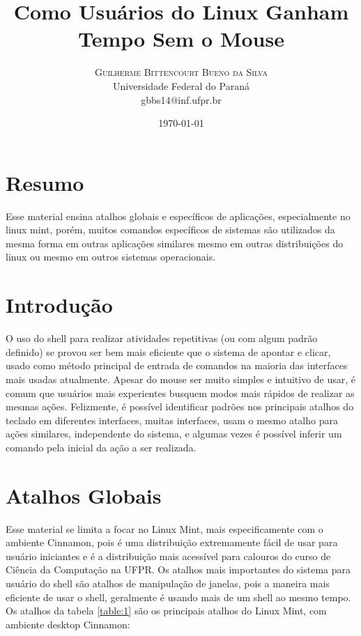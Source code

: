 \documentclass[oneside, 11 pt]{article}
\title{Como Usuários do Linux Ganham Tempo Sem o Mouse} %
\author{%
	\textsc{Guilherme Bittencourt Bueno da Silva} \\[1ex] %
	\normalsize Universidade Federal do Paraná \\ %
	\normalsize {gbbs14@inf.ufpr.br} %
}
\date{\today} %
\begin{document}
	
	\maketitle
	
	\section{Resumo}
	Esse material ensina atalhos globais e específicos de aplicações, especialmente no linux mint, porém, muitos comandos específicos de sistemas são utilizados da mesma forma em outras aplicações similares mesmo em outras distribuições do linux ou mesmo em outros sistemas operacionais.
	
	\section{Introdução}
	O uso do shell para realizar atividades repetitivas (ou com algum padrão definido) se provou ser bem mais eficiente que o sistema de apontar e clicar, usado como método principal de entrada de comandos na maioria das interfaces mais usadas atualmente. Apesar do mouse ser muito simples e intuitivo de usar, é comum que usuários mais experientes busquem modos mais rápidos de realizar as mesmas ações. Felizmente, é possível identificar padrões nos principais atalhos do teclado em diferentes interfaces, muitas interfaces, usam o mesmo atalho para ações similares, independente do sistema, e algumas vezes é possível inferir um comando pela inicial da ação a ser realizada.
	
	\section{Atalhos Globais}
	Esse material se limita a focar no Linux Mint, mais especificamente com o ambiente Cinnamon, pois é uma distribuição extremamente fácil de usar para usuário iniciantes e é a distribuição mais acessível para calouros do curso de Ciência da Computação na UFPR. Os atalhos mais importantes do sistema para usuário do shell são atalhos de manipulação de janelas, pois a maneira mais eficiente de usar o shell, geralmente é usando mais de um shell ao mesmo tempo. Os atalhos da tabela \ref{table:1} são os principais atalhos do Linux Mint, com ambiente desktop Cinnamon:
	
\end{document}
